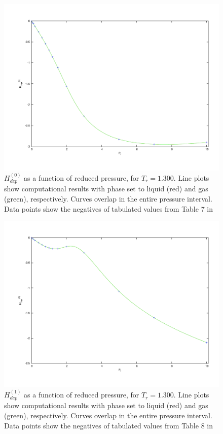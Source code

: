 \documentclass[internal,english]{sintefmemo2012}
\numberwithin{equation}{section}
\begin{document}
\begin{figure}[h]
	\centering
	\includegraphics[trim = 1.5cm 2cm 0 1cm, clip = true, width=14cm]{Hdep0Tc130}
	\caption{$H_{dep}^{(0)}$ as a function of reduced pressure, for $T_r = 1.300$. Line plots show computational results with phase set to liquid (red) and gas (green), respectively. Curves overlap in the entire pressure interval. Data points show the negatives of tabulated values from Table 7 in \cite{LK}}
	\label{fig:Hdep0Tc130}
\end{figure}


\begin{figure}
	\centering
	\includegraphics[trim = 1.5cm 2cm 0 1cm, clip = true, width=13cm]{Hdep1Tc130}
	\caption{$H_{dep}^{(1)}$ as a function of reduced pressure, for $T_r = 1.300$. Line plots show computational results with phase set to liquid (red) and gas (green), respectively. Curves overlap in the entire pressure interval. Data points show the negatives of tabulated values from Table 8 in \cite{LK}}
	\label{fig:Hdep1Tc130}
\end{figure}
\end{document}
